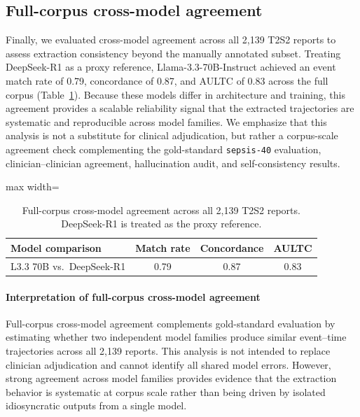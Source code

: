 \documentclass[pmlr,twocolumn,10pt]{jmlr} %
\begin{document}
\clearpage
\subsection{Full-corpus cross-model agreement}
\label{apd:full_corpus_agreement_results}
Finally, we evaluated cross-model agreement across all 2,139 T2S2 reports to assess extraction consistency beyond the manually annotated subset.
Treating DeepSeek-R1 as a proxy reference, Llama-3.3-70B-Instruct achieved an event match rate of 0.79, concordance of 0.87, and AULTC of 0.83 across the full corpus (Table~\ref{tab:full_corpus_agreement}).
Because these models differ in architecture and training, this agreement provides a scalable reliability signal that the extracted trajectories are systematic and reproducible across model families.
We emphasize that this analysis is not a substitute for clinical adjudication, but rather a corpus-scale agreement check complementing the gold-standard \texttt{sepsis-40} evaluation, clinician--clinician agreement, hallucination audit, and self-consistency results.

\begin{table}[ht]
\centering
\small
\caption{Full-corpus cross-model agreement across all 2,139 T2S2 reports. DeepSeek-R1 is treated as the proxy reference.}
\label{tab:full_corpus_agreement}
\begin{adjustbox}{max width=\columnwidth}
\begin{tabular}{lccc}
\toprule
Model comparison & Match rate & Concordance & AULTC \\
\midrule
L3.3 70B vs.\ DeepSeek-R1 & 0.79 & 0.87 & 0.83 \\
\bottomrule
\end{tabular}
\end{adjustbox}
\end{table}

\paragraph{Interpretation of full-corpus cross-model agreement}
Full-corpus cross-model agreement complements gold-standard evaluation by estimating whether two independent model families produce similar event--time trajectories across all 2,139 reports.
This analysis is not intended to replace clinician adjudication and cannot identify all shared model errors.
However, strong agreement across model families provides evidence that the extraction behavior is systematic at corpus scale rather than being driven by isolated idiosyncratic outputs from a single model.
\end{document}
